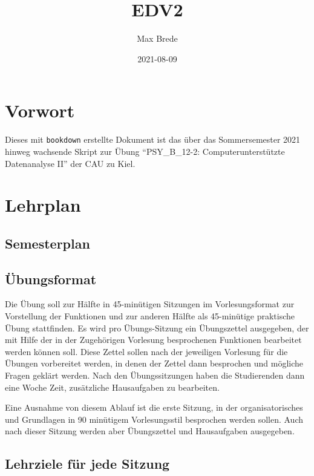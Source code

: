 \documentclass[
]{book}
\title{EDV2}
\author{Max Brede}
\date{2021-08-09}
\begin{document}
\maketitle

{
\setcounter{tocdepth}{1}
\tableofcontents
}
\hypertarget{vorwort}{%
\chapter{Vorwort}\label{vorwort}}

Dieses mit \texttt{bookdown} erstellte Dokument ist das über das Sommersemester 2021 hinweg wachsende Skript zur Übung ``PSY\_B\_12-2: Computerunterstützte Datenanalyse II'' der CAU zu Kiel.

\hypertarget{lehrplan}{%
\chapter{Lehrplan}\label{lehrplan}}

\hypertarget{semesterplan}{%
\section{Semesterplan}\label{semesterplan}}

\hypertarget{uxfcbungsformat}{%
\section{Übungsformat}\label{uxfcbungsformat}}

Die Übung soll zur Hälfte in 45-minütigen Sitzungen im Vorlesungsformat zur Vorstellung der Funktionen und zur anderen Hälfte als 45-minütige praktische Übung stattfinden.
Es wird pro Übungs-Sitzung ein Übungszettel ausgegeben, der mit Hilfe der in der Zugehörigen Vorlesung besprochenen Funktionen bearbeitet werden können soll.
Diese Zettel sollen nach der jeweiligen Vorlesung für die Übungen vorbereitet werden, in denen der Zettel dann besprochen und mögliche Fragen geklärt werden.
Nach den Übungssitzungen haben die Studierenden dann eine Woche Zeit, zusätzliche Hausaufgaben zu bearbeiten.

Eine Ausnahme von diesem Ablauf ist die erste Sitzung, in der organisatorisches und Grundlagen in 90 minütigem Vorlesungsstil besprochen werden sollen. Auch nach dieser Sitzung werden aber Übungszettel und Hausaufgaben ausgegeben.

\hypertarget{lehrziele-fuxfcr-jede-sitzung}{%
\section{Lehrziele für jede Sitzung}\label{lehrziele-fuxfcr-jede-sitzung}}
\end{document}

